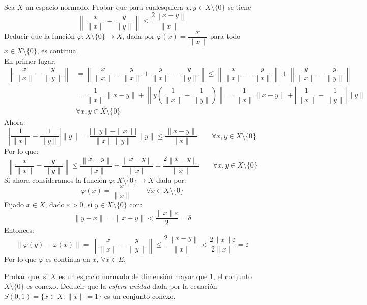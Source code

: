 \begin{ejercicio}
Sea \( X \) un espacio normado. Probar que para cualesquiera \( x, y \in X \setminus \{0\} \) se tiene
\[
    \left\| \frac{x}{\|x\|} - \frac{y}{\|y\|} \right\| \leq \frac{2\left\| x - y \right\|}{\|x\|}
\]
Deducir que la función \( \varphi : X \setminus \{0\} \rightarrow X \), dada por \( \varphi(x) = \dfrac{x}{\|x\|} \) para todo \( x \in X \setminus \{0\} \), es continua.\\

\noindent
En primer lugar:
\begin{align*}
    \left\|\dfrac{x}{\|x\|}-\dfrac{y}{\|y\|}\right\| &= \left\|\dfrac{x}{\|x\|} - \dfrac{y}{\|x\|} + \dfrac{y}{\|x\|}-\dfrac{y}{\|y\|}\right\| \leq \left\|\dfrac{x}{\|x\|} - \dfrac{y}{\|x\|}\right\| +\left\| \dfrac{y}{\|x\|}-\dfrac{y}{\|y\|}\right\| \\
                                                     &= \dfrac{1}{\|x\|} \|x-y\| + \left\| y\left(\dfrac{1}{\|x\|}-\dfrac{1}{\|y\|}\right)\right\| = \dfrac{1}{\|x\|} \|x-y\| +\left| \dfrac{1}{\|x\|}-\dfrac{1}{\|y\|}\right| \|y\| \\
                                                     & \forall x,y\in X\setminus \{0\}
\end{align*}
Ahora:
\begin{equation*}
    \left| \dfrac{1}{\|x\|}-\dfrac{1}{\|y\|}\right| \|y\|  = \dfrac{|\|y\|-\|x\||}{\|x\|\|y\|} \|y\|  \leq \dfrac{\|x-y\|}{\|x\|} \qquad \forall x,y\in X\setminus \{0\}
\end{equation*}
Por lo que:
\begin{equation*}
    \left\| \frac{x}{\|x\|} - \frac{y}{\|y\|} \right\| \leq \frac{\left\| x - y \right\|}{\|x\|} + \frac{\left\| x - y \right\|}{\|x\|} = \frac{2\left\| x - y \right\|}{\|x\|} \qquad  \forall x,y\in X\setminus \{0\}
\end{equation*}
Si ahora consideramos la función $\varphi:X\setminus \{0\}\to X$ dada por:
\begin{equation*}
    \varphi(x) = \dfrac{x}{\|x\|} \qquad \forall x\in X\setminus \{0\}
\end{equation*}
Fijado $x\in X$, dado $\varepsilon>0$, si $y\in X\setminus\{0\}$ con:
\begin{equation*}
    \|y-x\| = \|x-y\| < \dfrac{\|x\|\varepsilon}{2} = \delta
\end{equation*}
Entonces:
\begin{equation*}
    \|\varphi(y) - \varphi(x)\| = \left\| \frac{x}{\|x\|} - \frac{y}{\|y\|} \right\|\leq \frac{2\left\| x - y \right\|}{\|x\|} < \frac{2\|x\|\varepsilon}{2\|x\|} =  \varepsilon
\end{equation*}
Por lo que $\varphi$ es continua en $x$, $\forall x\in E$.
\end{ejercicio}

\begin{ejercicio}
Probar que, si \( X \) es un espacio normado de dimensión mayor que 1, el conjunto \( X \setminus \{0\} \) es conexo. Deducir que la \textit{esfera unidad} dada por la ecuación \( S(0,1) = \{ x \in X : \|x\| = 1 \} \) es un conjunto conexo.
\end{ejercicio}

